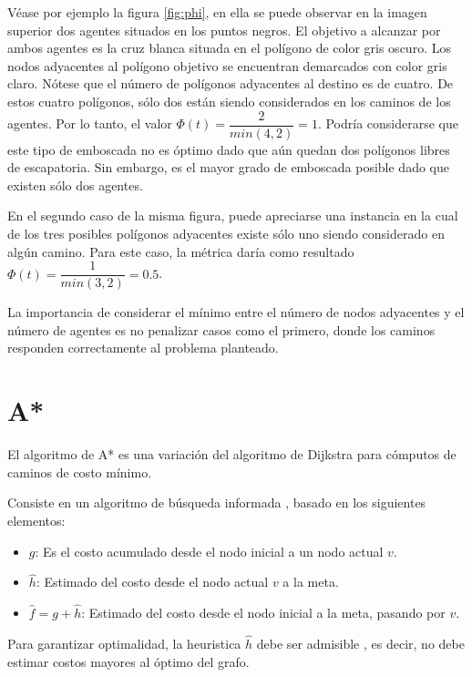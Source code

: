 \documentclass{egpubl}
\begin{document}
Véase por ejemplo la figura \ref{fig:phi}, en ella se puede
observar en la imagen superior dos agentes situados en los
puntos negros. El objetivo a alcanzar por ambos agentes es
la cruz blanca situada en el polígono de color gris oscuro.
Los nodos ad\-ya\-cen\-tes al polígono objetivo se encuentran
demarcados con color gris claro.
Nótese que el número de polígonos adyacentes al destino es de
cuatro. De estos cuatro polígonos, sólo dos están siendo
considerados en los caminos de los agentes. Por lo tanto, el
valor $\Phi(t) = \dfrac{2}{min(4,2)} = 1$. Podría con\-si\-de\-rar\-se
que este tipo de emboscada no es óptimo dado que aún
quedan dos polígonos libres de escapatoria. Sin embargo,
es el mayor grado de emboscada posible dado que existen
sólo dos agentes.

En el segundo caso de la misma figura, puede a\-pre\-ciar\-se
una instancia en la cual de los tres posibles polígonos adyacentes
existe sólo uno siendo considerado en algún camino. Para este
caso, la métrica daría como resultado
$\Phi(t) = \dfrac{1}{min(3,2)} = 0.5$.

La importancia de considerar el mínimo entre el número de
nodos adyacentes y el número de agentes es no penalizar casos
como el primero, donde los caminos responden co\-rrec\-ta\-men\-te
al problema planteado.

\section{A*}

El algoritmo de A* \cite{HNR72} \cite{RN93} \cite{MF09}
 es una variación del algoritmo de Dijkstra \cite{CLRS09}
para cómputos de caminos de costo mínimo.

Consiste en un algoritmo de búsqueda informada \cite{RN93},
basado en los siguientes elementos:

\begin{itemize}
\item $g$: Es el costo acumulado desde el nodo inicial a un nodo actual $v$.
\item $\hat{h}$: Estimado del costo desde el nodo actual $v$ a la meta.
\item $\hat{f} = g + \hat{h}$: Estimado del costo desde el nodo inicial a la meta, pasando por $v$.
\end{itemize}

Para garantizar optimalidad, la heuristica $\hat{h}$ debe
ser admisible \cite{HNR72}, es decir, no debe estimar
costos mayores al óptimo del grafo.
\end{document}
